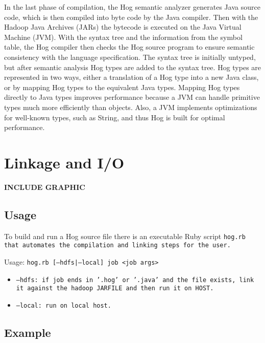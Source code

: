 \documentclass{book}
\begin{document}
In the last phase of compilation, the Hog semantic analyzer generates Java source code,
which is then compiled into byte code by the Java compiler. Then with the Hadoop Java Archives
(JARs) the bytecode is executed on the Java Virtual Machine (JVM). With the syntax tree and
the information from the symbol table, the Hog compiler then checks the Hog source program
to ensure semantic consistency with the language specification. The syntax tree is initially
untyped, but after semantic analysis Hog types are added to the syntax tree. Hog types are
represented in two ways, either a translation of a Hog type into a new Java class, or by
mapping Hog types to the equivalent Java types. Mapping Hog types directly to Java types
improves performance because a JVM can handle primitive types much more efficiently than 
objects. Also, a JVM implements optimizations for well-known types, such as String, and 
thus Hog is built for optimal performance.


\chapter{Linkage and I/O} %
\label{cha:linkage_and_i_o}

\textbf{INCLUDE GRAPHIC}

\section{Usage} %
\label{sec:usage}


To build and run a Hog source file there is an executable Ruby script \tt hog.rb
\rm that automates the compilation and linking steps for the user.

Usage: \tt hog.rb [--hdfs|--local] job <job args> \rm
\begin{itemize}
  \item[] \tt --hdfs\rm: if job ends in '.hog' or '.java' and the file exists, link it against the hadoop JARFILE and then run it on HOST.
  \item[] \tt --local\rm: run on local host.
\end{itemize}

\section{Example} %
\label{sec:example}
\end{document}

